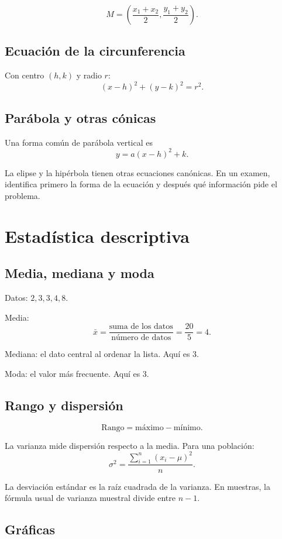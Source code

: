 \documentclass[10pt,oneside]{book}
\begin{document}
	\[
	M=\left(\frac{x_1+x_2}{2},\frac{y_1+y_2}{2}\right).
	\]
	
	\section{Ecuación de la circunferencia}
	
	Con centro $(h,k)$ y radio $r$:
	\[
	(x-h)^2+(y-k)^2=r^2.
	\]
	
	\section{Parábola y otras cónicas}
	
	Una forma común de parábola vertical es
	\[
	y=a(x-h)^2+k.
	\]
	
	La elipse y la hipérbola tienen otras ecuaciones canónicas.
	En un examen, identifica primero la forma de la ecuación y
	después qué información pide el problema.
	
	\chapter{Estadística descriptiva}
	
	\section{Media, mediana y moda}
	
	Datos: $2,3,3,4,8$.
	
	Media:
	\[
	\bar{x}=\frac{\text{suma de los datos}}{\text{número de datos}}
	=\frac{20}{5}=4.
	\]
	
	Mediana: el dato central al ordenar la lista. Aquí es 3.
	
	Moda: el valor más frecuente. Aquí es 3.
	
	\section{Rango y dispersión}
	
	\[
	\text{Rango}=\text{máximo}-\text{mínimo}.
	\]
	
	La varianza mide dispersión respecto a la media.
	Para una población:
	\[
	\sigma^2=\frac{\sum_{i=1}^n(x_i-\mu)^2}{n}.
	\]
	
	La desviación estándar es la raíz cuadrada de la varianza.
	En muestras, la fórmula usual de varianza muestral divide
	entre $n-1$.
	
	\section{Gráficas}
	
\end{document}
